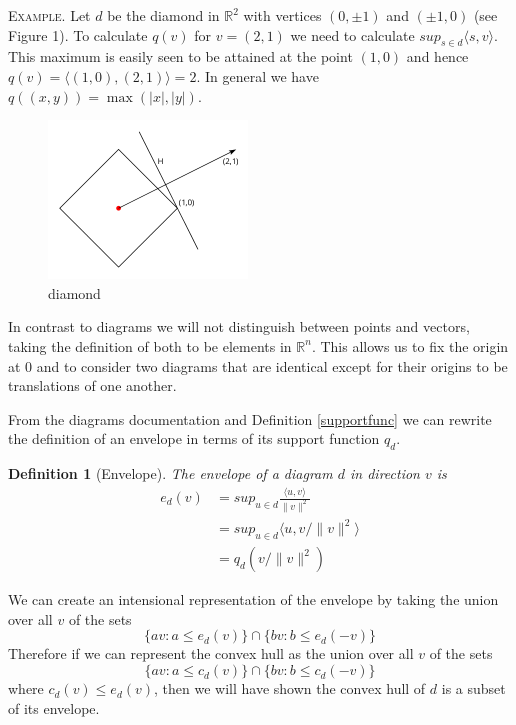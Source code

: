 \documentclass[11pt]{amsart}
\newtheorem{defn}{Definition}
\begin{document}
  \textsc{Example}. Let $d$ be the diamond in $\mathbb{R}^2$ with vertices $(0, \pm1)$ and $(\pm 1, 0)$ (see Figure 1). To calculate $q(v)$ for $v = (2,1)$
  we need to calculate $sup_{s \in d} \langle s, v \rangle$. This maximum is easily seen to be attained at the point $(1,0)$ and hence $q(v) = \langle (1,0),(2,1) \rangle = 2$. In
  general we have $q((x,y)) = \max(|x|,|y|)$.

  \begin{figure}[h]
    \label{diamond}
    \centering
    \includegraphics[width=150pt]{diamond.png}
    \caption{diamond}
  \end{figure}

  In contrast to diagrams we will not distinguish between points and vectors, taking the definition of both to be elements in $\mathbb{R}^n$.
  This allows us to fix the origin at $0$ and to consider two diagrams that are identical except for their origins to be translations of one another.

  From the diagrams documentation and Definition \ref{supportfunc} we can rewrite the definition of an envelope
  in terms of its support function $q_d$.
  \begin{defn}[Envelope]
    The envelope of a diagram $d$ in direction $v$ is
    \begin{align}
      e_d(v) &= sup_{u \in d} \frac{\langle u, v \rangle}{\|v\|^2}\\
      &=sup_{u \in d} \langle u, v/\|v\|^2 \rangle\\
      &=q_d(v/\|v\|^2)
    \end{align}
  \end{defn}

  We can create an intensional representation of the envelope by taking the union over all $v$ of the sets
  $$\{av : a \leq e_d(v)\} \cap \{ bv : b \leq e_d(-v)\}$$
  Therefore if we can represent the convex hull as the union over all $v$ of the sets
  $$\{av : a \leq c_d(v)\} \cap \{ bv : b \leq c_d(-v)\}$$
  where $c_d(v) \leq e_d(v)$, then we will have shown the convex hull of $d$ is a subset of its envelope.
\end{document}
